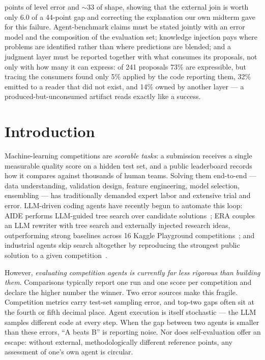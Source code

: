 \documentclass[11pt,a4paper]{article}
\begin{document}
points of level error and ${\sim}33$ of shape, showing that the external join is worth only $6.0$ of a 44-point gap and correcting the explanation our own midterm gave for this failure. Agent-benchmark claims must be stated jointly with an error model and the composition of the evaluation set; knowledge injection pays where problems are identified rather than where predictions are blended; and a judgment layer must be reported together with what consumes its proposals, not only with how many it can express: of 241 proposals 73\% are expressible, but tracing the consumers found only 5\% applied by the code reporting them, 32\% emitted to a reader that did not exist, and 14\% owned by another layer --- a produced-but-unconsumed artifact reads exactly like a success.

\vspace{0.5em}

\section{Introduction}

Machine-learning competitions are \emph{scorable tasks}: a submission receives a single measurable quality score on a hidden test set, and a public leaderboard records how it compares against thousands of human teams. Solving them end-to-end --- data understanding, validation design, feature engineering, model selection, ensembling --- has traditionally demanded expert labor and extensive trial and error. LLM-driven coding agents have recently begun to automate this loop: AIDE performs LLM-guided tree search over candidate solutions~\cite{aide2025}; ERA couples an LLM rewriter with tree search and externally injected research ideas, outperforming strong baselines across 16 Kaggle Playground competitions~\cite{aygun2026}; and industrial agents skip search altogether by reproducing the strongest public solution to a given competition~\cite{nvidia2026}.

However, \emph{evaluating competition agents is currently far less rigorous than building them}. Comparisons typically report one run and one score per competition and declare the higher number the winner. Two error sources make this fragile. Competition metrics carry test-set sampling error, and top-two gaps often sit at the fourth or fifth decimal place. Agent execution is itself stochastic --- the LLM samples different code at every step. When the gap between two agents is smaller than these errors, ``A beats B'' is reporting noise. Nor does self-evaluation offer an escape: without external, methodologically different reference points, any assessment of one's own agent is circular.
\end{document}
